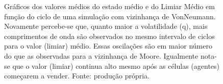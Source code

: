 \documentclass[
	12pt,				%
	openright,			%
	twoside,			%
	a4paper,			%
	english,			%
	french,				%
	spanish,			%
	brazil				%
	]{abntex2}
\begin{document}
\begin{figure}
  \centering

  
  \caption{Gráficos dos valores médios do estado médio e do Limiar Médio em função do ciclo de uma simulação com vizinhança de VonNeumann. Novamente percebe-se que, quanto maior a volatilidade (q), mais comprimentos de onda são observados no mesmo intervalo de ciclos para o valor (limiar) médio. Essas oscilações são em maior número do que as observadas para a vizinhança de Moore. Igualmente nota-se que o valor (limiar) continua alto mesmo após as células (agentes) começarem a vender. Fonte: produção própria.}
  \label{fig:volatilidadeVonNeumann}
\end{figure}
\end{document}
